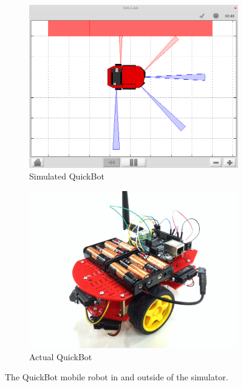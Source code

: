 \documentclass[10pt]{article}
\begin{document}
\begin{figure}[t]
  \centering
  \begin{subfigure}{0.45\textwidth}
    \includegraphics[width=\textwidth]{images/simiam-quickbot.png}
    \caption{Simulated QuickBot}
    \label{fig:simulated-quickbot}
  \end{subfigure}
  \begin{subfigure}{0.45\textwidth}
    \includegraphics[width=\textwidth]{images/quickbot-red.png}
    \caption{Actual QuickBot}
    \label{fig:actual-quickbot}
  \end{subfigure}
  \caption{The QuickBot mobile robot in and outside of the simulator.}\label{fig:animals}
  \label{fig:quickbot}
\end{figure}
\end{document}

